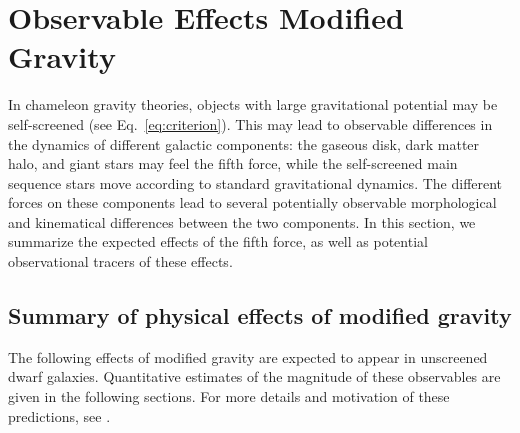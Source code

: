 \documentclass[useAMS,usenatbib,twocolumn]{mn2e}
\begin{document}
\section{Observable Effects Modified Gravity}
\label{sec:test-summary}

In chameleon gravity theories, objects with large gravitational potential
may be self-screened (see Eq.~\ref{eq:criterion}).  This may lead to observable
differences in the dynamics of different galactic components:  
the gaseous disk, dark matter halo, and giant
stars may feel the fifth force, while the self-screened main sequence
stars move according to standard gravitational dynamics.
The different forces on these components lead to several potentially observable
morphological and kinematical differences between the two components. In
this section, we summarize the expected effects of the fifth force, as well
as potential observational tracers of these effects.


\subsection{Summary of physical effects of modified gravity}
The following effects of modified gravity are expected to appear in 
unscreened dwarf galaxies.
Quantitative estimates of the magnitude of these
observables are given in the following sections.
For more details and motivation of these predictions, see \citet{bhuvjake2011}. 
\end{document}
